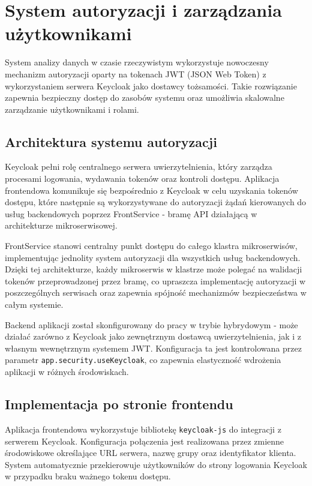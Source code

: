 \section{System autoryzacji i zarządzania użytkownikami}
\label{chap:autoryzacja}

System analizy danych w czasie rzeczywistym wykorzystuje nowoczesny mechanizm autoryzacji oparty na tokenach JWT (JSON Web Token) z wykorzystaniem serwera Keycloak jako dostawcy tożsamości. Takie rozwiązanie zapewnia bezpieczny dostęp do zasobów systemu oraz umożliwia skalowalne zarządzanie użytkownikami i rolami.

\subsection{Architektura systemu autoryzacji}

Keycloak pełni rolę centralnego serwera uwierzytelnienia, który zarządza procesami logowania, wydawania tokenów oraz kontroli dostępu. Aplikacja frontendowa komunikuje się bezpośrednio z Keycloak w celu uzyskania tokenów dostępu, które następnie są wykorzystywane do autoryzacji żądań kierowanych do usług backendowych poprzez FrontService - bramę API działającą w architekturze mikroserwisowej.

FrontService stanowi centralny punkt dostępu do całego klastra mikroserwisów, implementując jednolity system autoryzacji dla wszystkich usług backendowych. Dzięki tej architekturze, każdy mikroserwis w klastrze może polegać na walidacji tokenów przeprowadzonej przez bramę, co upraszcza implementację autoryzacji w poszczególnych serwisach oraz zapewnia spójność mechanizmów bezpieczeństwa w całym systemie.

Backend aplikacji został skonfigurowany do pracy w trybie hybrydowym - może działać zarówno z Keycloak jako zewnętrznym dostawcą uwierzytelnienia, jak i z własnym wewnętrznym systemem JWT. Konfiguracja ta jest kontrolowana przez parametr \texttt{app.security.useKeycloak}, co zapewnia elastyczność wdrożenia aplikacji w różnych środowiskach.

\subsection{Implementacja po stronie frontendu}

Aplikacja frontendowa wykorzystuje bibliotekę \texttt{keycloak-js} do integracji z serwerem Keycloak. Konfiguracja połączenia jest realizowana przez zmienne środowiskowe określające URL serwera, nazwę grupy oraz identyfikator klienta. System automatycznie przekierowuje użytkowników do strony logowania Keycloak w przypadku braku ważnego tokenu dostępu.

